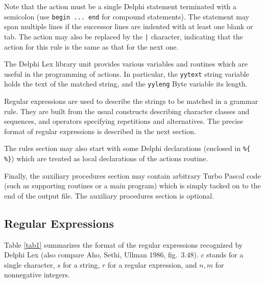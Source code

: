 \documentclass[a4paper]{article}
\begin{document}
Note that the action must be a single Delphi statement terminated
with a semicolon (use \verb"begin ... end" for compound statements). The
statement may span multiple lines if the successor lines are indented with
at least one blank or tab. The action may also be replaced by the \verb"|"
character, indicating that the action for this rule is the same as that for
the next one.

The Delphi Lex library unit provides various variables and routines which are
useful in the programming of actions. In particular, the \verb"yytext" string
variable holds the text of the matched string, and the \verb"yyleng" Byte
variable its length.

Regular expressions are used to describe the strings to be matched in a
grammar rule. They are built from the usual constructs describing character
classes and sequences, and operators specifying repetitions and alternatives.
The precise format of regular expressions is described in the next section.

The rules section may also start with some Delphi declarations
(enclosed in \verb"%{ %}") which are treated as local declarations of the
actions routine.

Finally, the auxiliary procedures section may contain arbitrary Turbo
Pascal code (such as supporting routines or a main program) which is
simply tacked on to the end of the output file. The auxiliary procedures
section is optional.

\subsection{Regular Expressions}

Table \ref{tab1} summarizes the format of the regular expressions
recognized by Delphi Lex (also compare Aho, Sethi, Ullman 1986, fig.\ 3.48).
$c$ stands for a single character, $s$ for a string, $r$ for a regular
expression, and $n,m$ for nonnegative integers.
\end{document}
